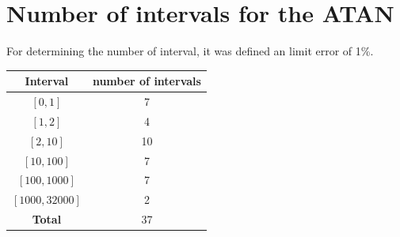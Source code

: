\documentclass[12pt,a4paper]{article}
\begin{document}
\section{Number of intervals for the ATAN}


For determining the number of interval, it was defined an limit error of 1\%. 



\begin{table}[!htb]
\centering
	\begin{tabular}{cc}
	Interval & number of intervals\\
	\hline
	$[0,1]$ & 7 \\
	$[1,2]$ & 4 \\
	$[2,10]$ & 10 \\
	$[10,100]$ & 7 \\
	$[100,1000]$ & 7 \\
	$[1000,32000]$ & 2 \\
	\textbf{Total} & 37
	\end{tabular}
\end{table}
\end{document}
